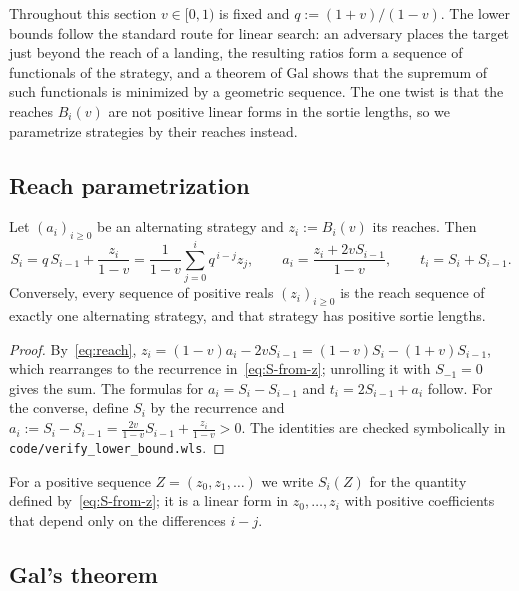 \documentclass[runningheads,envcountsame,envcountsect]{llncs}
\begin{document}
Throughout this section $v \in [0, 1)$ is fixed and $q := (1+v)/(1-v)$. The lower bounds follow the standard route for linear search: an adversary places the target just beyond the reach of a landing, the resulting ratios form a sequence of functionals of the strategy, and a theorem of Gal shows that the supremum of such functionals is minimized by a geometric sequence. The one twist is that the reaches $B_i(v)$ are not positive linear forms in the sortie lengths, so we parametrize strategies by their reaches instead.

\subsection{Reach parametrization}

\begin{lemma}\label{lem:reach}
Let $(a_i)_{i \geq 0}$ be an alternating strategy and $z_i := B_i(v)$ its reaches. Then
\begin{equation}\label{eq:S-from-z}
  S_i = q\, S_{i-1} + \frac{z_i}{1-v} = \frac{1}{1-v} \sum_{j=0}^{i} q^{\,i-j} z_j, \qquad
  a_i = \frac{z_i + 2v S_{i-1}}{1-v}, \qquad
  t_i = S_i + S_{i-1} .
\end{equation}
Conversely, every sequence of positive reals $(z_i)_{i \geq 0}$ is the reach sequence of exactly one alternating strategy, and that strategy has positive sortie lengths.
\end{lemma}
\begin{proof}
By~\eqref{eq:reach}, $z_i = (1-v) a_i - 2v S_{i-1} = (1-v) S_i - (1+v) S_{i-1}$, which rearranges to the recurrence in~\eqref{eq:S-from-z}; unrolling it with $S_{-1} = 0$ gives the sum. The formulas for $a_i = S_i - S_{i-1}$ and $t_i = 2S_{i-1} + a_i$ follow. For the converse, define $S_i$ by the recurrence and $a_i := S_i - S_{i-1} = \frac{2v}{1-v} S_{i-1} + \frac{z_i}{1-v} > 0$. The identities are checked symbolically in \texttt{code/verify\_lower\_bound.wls}.
\end{proof}

For a positive sequence $Z = (z_0, z_1, \ldots)$ we write $S_i(Z)$ for the quantity defined by~\eqref{eq:S-from-z}; it is a linear form in $z_0, \ldots, z_i$ with positive coefficients that depend only on the differences $i - j$.

\subsection{Gal's theorem}
\end{document}
